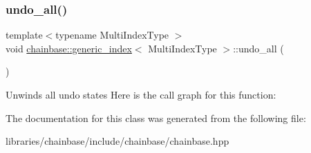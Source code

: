 \subsubsection{\texorpdfstring{undo\+\_\+all()}{undo\_all()}}
{\footnotesize\ttfamily template$<$typename Multi\+Index\+Type $>$ \\
void \mbox{\hyperlink{classchainbase_1_1generic__index}{chainbase\+::generic\+\_\+index}}$<$ Multi\+Index\+Type $>$\+::undo\+\_\+all (\begin{DoxyParamCaption}{ }\end{DoxyParamCaption})\hspace{0.3cm}{\ttfamily [inline]}}

Unwinds all undo states Here is the call graph for this function\+:


The documentation for this class was generated from the following file\+:\begin{DoxyCompactItemize}
\item 
libraries/chainbase/include/chainbase/chainbase.\+hpp\end{DoxyCompactItemize}
